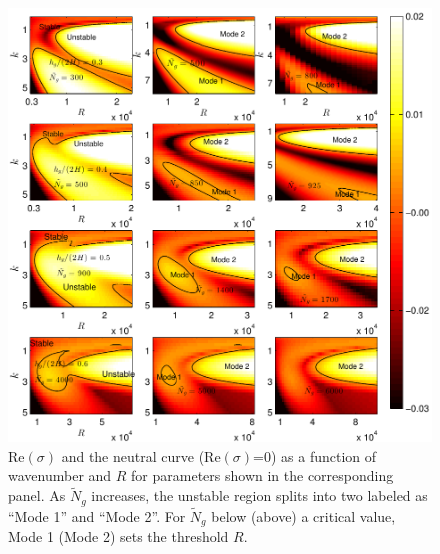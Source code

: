 \documentclass[12pt]{report}   %
\newcommand{\Rey}{{R}}
\newcommand{\Ndg}{\tilde{N}_g}
\begin{document}
\begin{figure}
 \centerline{\includegraphics[]{SetAll_imgsc4}}

\caption[$\text{Re}(\sigma)$ and the neutral curve ($\text{Re}(\sigma)$=0) as a function of $k$ and $\Rey$]{
$\text{Re}(\sigma)$ and the neutral curve ($\text{Re}(\sigma)$=0) as a function of wavenumber and $\Rey$ for parameters shown in the corresponding panel.  
As $\Ndg$ increases, the unstable region splits into two labeled as ``Mode 1'' and ``Mode 2''. 
For $\Ndg$ below (above) a critical value, Mode 1 (Mode 2) sets the threshold $\Rey$.
}
\label{K_Re_sigma_set3}
\end{figure}
\end{document}
